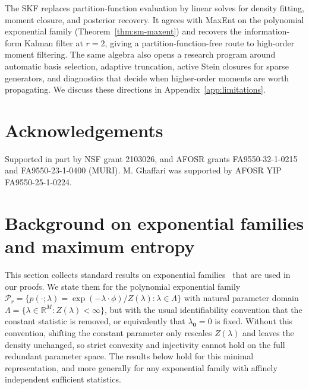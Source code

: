 \documentclass{article}
\newcommand{\R}{\mathbb{R}}
\theoremstyle{definition}
\begin{document}
The SKF replaces partition-function evaluation by linear solves for density
fitting, moment closure, and posterior recovery. It agrees with MaxEnt on
the polynomial exponential family (Theorem~\ref{thm:sm-maxent}) and recovers
the information-form Kalman filter at $r=2$, giving a partition-function-free
route to high-order moment filtering. The same algebra also opens a research
program around automatic basis selection, adaptive truncation, active Stein
closures for sparse generators, and diagnostics that decide when higher-order
moments are worth propagating. We discuss these directions in
Appendix~\ref{app:limitations}.

\section*{Acknowledgements}
Supported in part by NSF grant 2103026, and AFOSR grants
FA9550-32-1-0215 and FA9550-23-1-0400 (MURI). M. Ghaffari was supported by AFOSR YIP FA9550-25-1-0224.




\newpage
\appendix
\renewcommand{\thefigure}{A\arabic{figure}}
\setcounter{figure}{0}
\renewcommand{\thetable}{A\arabic{table}}
\setcounter{table}{0}
\renewcommand{\theequation}{A.\arabic{equation}}
\setcounter{equation}{0}

\section{Background on exponential families and maximum entropy}
\label{app:expfam}

This section collects standard results on exponential families~\cite{wainwright2008,jaynes1957}
that are used in our proofs.
We state them for the polynomial exponential family
$\mathcal{P}_r = \{p(\cdot;\lambda) = \exp(-\lambda\cdot\phi)/Z(\lambda) : \lambda \in \Lambda\}$ with natural parameter domain $\Lambda = \{\lambda \in \R^M : Z(\lambda) < \infty\}$,
but with the usual identifiability convention that the constant statistic
is removed, or equivalently that $\lambda_{\mathbf{0}}=0$ is fixed.
Without this convention, shifting the constant parameter only rescales
$Z(\lambda)$ and leaves the density unchanged, so strict convexity and
injectivity cannot hold on the full redundant parameter space.
The results below hold for this minimal representation, and more generally
for any exponential family with affinely independent sufficient statistics.
\end{document}
